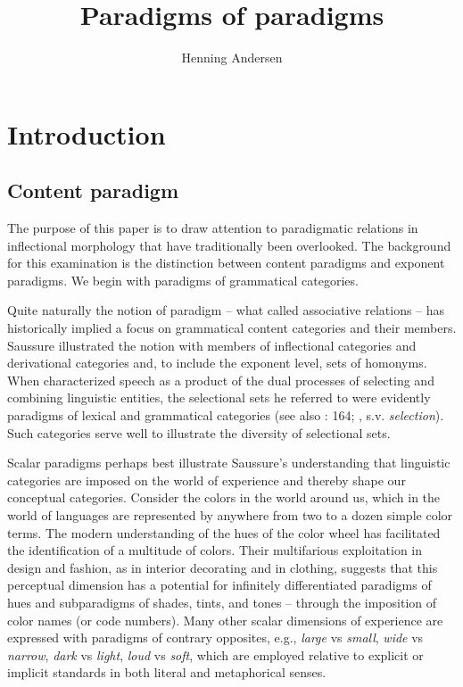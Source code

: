 \documentclass[output=paper, colorlinks,citecolor=brown]{langsci/langscibook}
\author{Henning Andersen\affiliation{University of California, Los Angeles}}
\title{Paradigms of paradigms}
\begin{document}
\maketitle

\section{Introduction} \label{andersen_sec1}
\subsection{Content paradigm} \label{content_paradigm}\largerpage

The purpose of this paper is to draw attention to paradigmatic relations in inflectional morphology that have traditionally been overlooked. The background for this examination is the distinction between content paradigms and exponent paradigms. We begin with paradigms of grammatical categories.

Quite naturally the notion of paradigm – what \citet{Saussure1959} called associative relations – has historically implied a focus on grammatical content categories and their members. Saussure illustrated the notion with members of inflectional categories and derivational categories and, to include the exponent level, sets of homonyms. When \citet{Jakobson1956a} characterized speech as a product of the dual processes of selecting and combining linguistic entities, the selectional sets he referred to were evidently paradigms of lexical and grammatical categories (see also \citealt{Bloomfield1933}: 164; \citealt{Hamp1966}, s.v. \textit{selection}). Such categories serve well to illustrate the diversity of selectional sets.

Scalar paradigms perhaps best illustrate Saussure's understanding that linguistic categories are imposed on the world of experience and thereby shape our conceptual categories. Consider the colors in the world around us, which in the world of languages are represented by anywhere from two to a dozen simple color terms. The modern understanding of the hues of the color wheel has facilitated the identification of a multitude of colors. Their multifarious exploitation in design and fashion, as in interior decorating and in clothing, suggests that this perceptual dimension has a potential for infinitely differentiated paradigms of hues and subparadigms of shades, tints, and tones -- through the imposition of color names (or code numbers). Many other scalar dimensions of experience are expressed with paradigms of contrary opposites, e.g., \textit{large} vs \textit{small}, \textit{wide} vs \textit{narrow}, \textit{dark} vs \textit{light}, \textit{loud} vs \textit{soft}, which are employed relative to explicit or implicit standards in both literal and metaphorical senses.
\end{document}
